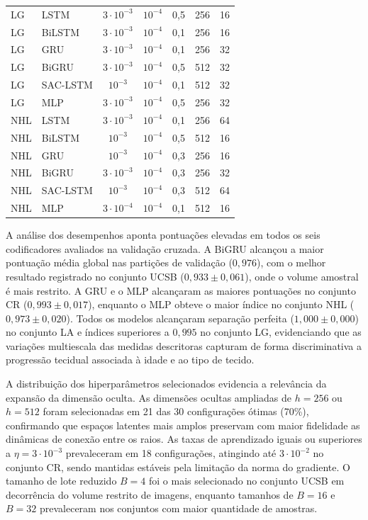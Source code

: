 \begin{table}[htb]
{\begin{tabular}{llccccc}
\midrule
LG & LSTM & $3\cdot 10^{-3}$ & $10^{-4}$ & 0{,}5 & 256 & 16 \\
LG & BiLSTM & $3\cdot 10^{-3}$ & $10^{-4}$ & 0{,}1 & 256 & 16 \\
LG & GRU & $3\cdot 10^{-3}$ & $10^{-4}$ & 0{,}1 & 256 & 32 \\
LG & BiGRU & $3\cdot 10^{-3}$ & $10^{-4}$ & 0{,}5 & 512 & 32 \\
LG & SAC-LSTM & $10^{-3}$ & $10^{-4}$ & 0{,}1 & 512 & 32 \\
LG & MLP & $3\cdot 10^{-3}$ & $10^{-4}$ & 0{,}5 & 256 & 32 \\
\midrule
NHL & LSTM & $3\cdot 10^{-3}$ & $10^{-4}$ & 0{,}1 & 256 & 64 \\
NHL & BiLSTM & $10^{-3}$ & $10^{-4}$ & 0{,}5 & 512 & 16 \\
NHL & GRU & $10^{-3}$ & $10^{-4}$ & 0{,}3 & 256 & 16 \\
NHL & BiGRU & $3\cdot 10^{-3}$ & $10^{-4}$ & 0{,}3 & 256 & 32 \\
NHL & SAC-LSTM & $10^{-3}$ & $10^{-4}$ & 0{,}3 & 512 & 64 \\
NHL & MLP & $3\cdot 10^{-4}$ & $10^{-4}$ & 0{,}1 & 512 & 16 \\
\bottomrule
\end{tabular}%
}
\end{table}

A análise dos desempenhos aponta pontuações elevadas em todos os seis codificadores avaliados na validação cruzada. A BiGRU alcançou a maior pontuação média global nas partições de validação ($0{,}976$), com o melhor resultado registrado no conjunto UCSB ($0{,}933 \pm 0{,}061$), onde o volume amostral é mais restrito. A GRU e o MLP alcançaram as maiores pontuações no conjunto CR ($0{,}993 \pm 0{,}017$), enquanto o MLP obteve o maior índice no conjunto NHL ($0{,}973 \pm 0{,}020$). Todos os modelos alcançaram separação perfeita ($1{,}000 \pm 0{,}000$) no conjunto LA e índices superiores a $0{,}995$ no conjunto LG, evidenciando que as variações multiescala das medidas descritoras capturam de forma discriminativa a progressão tecidual associada à idade e ao tipo de tecido.

A distribuição dos hiperparâmetros selecionados evidencia a relevância da expansão da dimensão oculta. As dimensões ocultas ampliadas de $h = 256$ ou $h = 512$ foram selecionadas em 21 das 30 configurações ótimas (70\%), confirmando que espaços latentes mais amplos preservam com maior fidelidade as dinâmicas de conexão entre os raios. As taxas de aprendizado iguais ou superiores a $\eta = 3\cdot 10^{-3}$ prevaleceram em 18 configurações, atingindo até $3\cdot 10^{-2}$ no conjunto CR, sendo mantidas estáveis pela limitação da norma do gradiente. O tamanho de lote reduzido $B = 4$ foi o mais selecionado no conjunto UCSB em decorrência do volume restrito de imagens, enquanto tamanhos de $B = 16$ e $B = 32$ prevaleceram nos conjuntos com maior quantidade de amostras.

